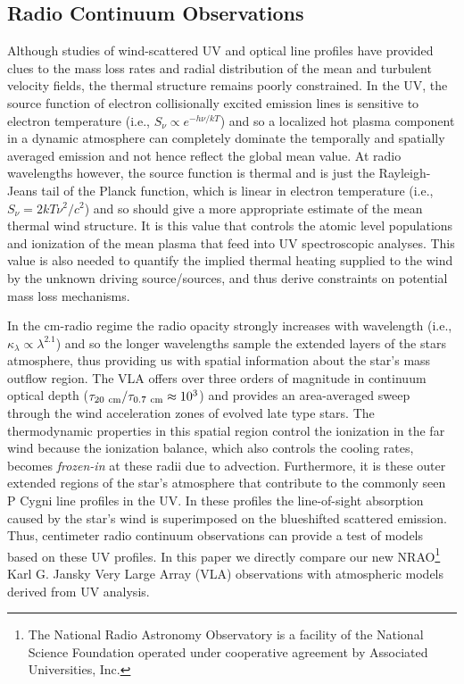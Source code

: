 \documentclass[iop]{emulateapj}
\begin{document}
\subsection{Radio Continuum Observations} \label{intro1} 

Although studies of wind-scattered UV and optical line profiles have provided clues to the mass loss rates and radial distribution of the mean and turbulent velocity fields, the thermal structure remains poorly constrained. In the UV, the source function of electron collisionally excited emission lines is sensitive to electron temperature (i.e., $S_{\nu} \propto e^{-h\nu /kT}$) and so a localized hot plasma component in a dynamic atmosphere can completely dominate the temporally and spatially averaged emission and not hence reflect the global mean value. At radio wavelengths however, the source function is thermal and is just the Rayleigh-Jeans tail of the Planck function, which is linear in electron temperature (i.e., $S_{\nu} = {2kT\nu ^2 /c^2}$) and so should give a more appropriate estimate of the mean thermal wind structure. It is this value that controls the atomic level populations and ionization of the mean plasma that feed into UV spectroscopic analyses. This value is also needed to quantify the implied thermal heating supplied to the  wind by the unknown driving source/sources, and thus derive constraints on potential mass loss mechanisms.

In the cm-radio regime the radio opacity strongly increases with wavelength (i.e., $ \kappa _{\lambda} \propto \lambda ^{2.1}$) and so the longer wavelengths sample the extended layers of the stars atmosphere, thus	 providing us with spatial information about the star's mass outflow region. The VLA offers over three orders of magnitude in continuum optical depth ($\tau _{20 \ \rm{cm}}/\tau _{0.7 \ \rm{cm}} \approx 10^3$) and provides an area-averaged sweep through the wind acceleration zones of evolved late type stars. The thermodynamic properties in this spatial region control the ionization in the far wind because the ionization balance, which also controls the cooling rates, becomes \textit{frozen-in} at these radii due to advection. Furthermore, it is these outer extended regions of the star's atmosphere that contribute to the commonly seen P Cygni line profiles in the UV. In these profiles the line-of-sight absorption caused by the star's wind is superimposed on the blueshifted scattered emission. Thus, centimeter radio continuum observations can provide a test of models based on these UV profiles. In this paper we directly compare our new NRAO\footnote{The National Radio Astronomy Observatory is a facility of the National Science Foundation operated under cooperative agreement by Associated Universities, Inc.} Karl G. Jansky Very Large Array (VLA) observations with atmospheric models derived from UV analysis.
\end{document}
